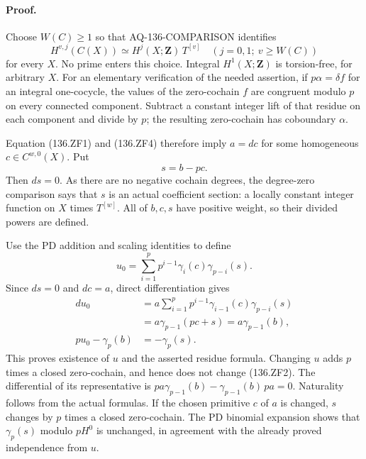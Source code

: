 \paragraph{Proof.}
Choose \(W(C)\geq1\) so that AQ-136-COMPARISON identifies
\[
 H^{v,j}(C(X))\simeq H^j(X;\mathbf Z)\,T^{[v]}
               \quad(j=0,1;\ v\geq W(C))
 \tag{136.ZF4}
\]
for every \(X\). No prime enters this choice.
Integral \(H^1(X;\mathbf Z)\) is torsion-free, for arbitrary \(X\).
For an elementary verification of the needed assertion, if
\(p\alpha=\delta f\) for an integral one-cocycle, the values of
the zero-cochain \(f\) are congruent modulo \(p\) on every connected
component. Subtract a constant integer lift of that residue on
each component and divide by \(p\); the resulting zero-cochain
has coboundary \(\alpha\).

Equation (136.ZF1) and (136.ZF4) therefore imply \(a=dc\) for some
homogeneous \(c\in C^{w,0}(X)\). Put
\[
                              s=b-pc .
\]
Then \(ds=0\). As there are no negative cochain degrees, the
degree-zero comparison says that \(s\) is an actual coefficient
section: a locally constant integer function on \(X\) times
\(T^{[w]}\). All of \(b,c,s\) have positive weight, so their
divided powers are defined.

Use the PD addition and scaling identities to define
\[
 u_0=\sum_{i=1}^p
       p^{i-1}\gamma_i(c)\gamma_{p-i}(s).
 \tag{136.ZF5}
\]
Since \(ds=0\) and \(dc=a\), direct differentiation gives
\[
 \begin{split}
 du_0
 &=a\sum_{i=1}^p
       p^{i-1}\gamma_{i-1}(c)\gamma_{p-i}(s)\\
 &=a\gamma_{p-1}(pc+s)
  =a\gamma_{p-1}(b),\\
 p u_0-\gamma_p(b)&=-\gamma_p(s).
 \end{split}
 \tag{136.ZF6}
\]
This proves existence of \(u\) and the asserted residue formula.
Changing \(u\) adds \(p\) times a closed zero-cochain, and hence
does not change (136.ZF2). The differential of its representative
is \(p a\gamma_{p-1}(b)-\gamma_{p-1}(b)\,p a=0\).
Naturality follows from the actual formulas. If the chosen
primitive \(c\) of \(a\) is changed, \(s\) changes by \(p\) times
a closed zero-cochain. The PD binomial expansion shows that
\(\gamma_p(s)\) modulo \(pH^0\) is unchanged, in agreement with
the already proved independence from \(u\).

